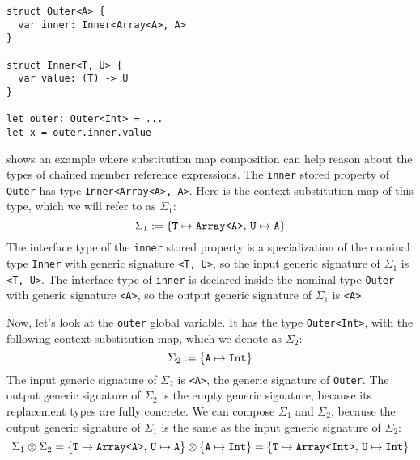 \documentclass[../generics]{subfiles}
\begin{document}
\begin{listing}\label{composesubstmaplisting}
\begin{Verbatim}
struct Outer<A> {
  var inner: Inner<Array<A>, A>
}

struct Inner<T, U> {
  var value: (T) -> U
}

let outer: Outer<Int> = ...
let x = outer.inner.value
\end{Verbatim}
\end{listing}
\begin{example}\label{composesubstmapexample}
 shows an example where substitution map composition can help reason about the types of chained member reference expressions. The \texttt{inner} stored property of \texttt{Outer} has type \texttt{Inner<Array<A>, A>}. Here is the context substitution map of this type, which we will refer to as $\Sigma_1$:
\[
\Sigma_1 := \{ \texttt{T} \mapsto \texttt{Array<A>},\,\texttt{U} \mapsto \texttt{A} \}
\]
The interface type of the \texttt{inner} stored property is a specialization of the nominal type \texttt{Inner} with generic signature \texttt{<T, U>}, so the input generic signature of $\Sigma_1$ is \texttt{<T, U>}. The interface type of \texttt{inner} is declared inside the nominal type \texttt{Outer} with generic signature \texttt{<A>}, so the output generic signature of $\Sigma_1$ is \texttt{<A>}.

Now, let's look at the \texttt{outer} global variable. It has the type \texttt{Outer<Int>}, with the following context substitution map, which we denote as $\Sigma_2$:
\[
\Sigma_2 := \{ \texttt{A} \mapsto \texttt{Int} \}
\]
The input generic signature of $\Sigma_2$ is \texttt{<A>}, the generic signature of \texttt{Outer}. The output generic signature of $\Sigma_2$ is the empty generic signature, because its replacement types are fully concrete. We can compose $\Sigma_1$ and $\Sigma_2$, because the output generic signature of $\Sigma_1$ is the same as the input generic signature of $\Sigma_2$:
\[\Sigma_1\otimes\Sigma_2 = \{ \texttt{T} \mapsto \texttt{Array<A>},\,\texttt{U} \mapsto \texttt{A} \}\otimes\{ \texttt{A} \mapsto \texttt{Int} \} = \{ \texttt{T} \mapsto \texttt{Array<Int>},\,\texttt{U} \mapsto \texttt{Int} \}\]


\end{example}
\end{document}
